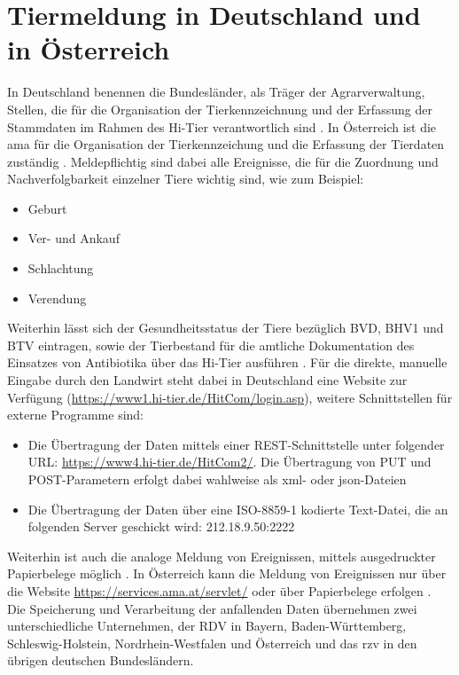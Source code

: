\section{Tiermeldung in Deutschland und in Österreich}
In Deutschland benennen die Bundesländer, als Träger der Agrarverwaltung, Stellen, die für die Organisation der Tierkennzeichnung und der Erfassung der Stammdaten im Rahmen des Hi-Tier verantwortlich sind \autocite{hi-tier_regionalstellen_2015}. 
In Österreich ist die ama für die Organisation der Tierkennzeichung und die Erfassung der Tierdaten zuständig \autocite{agrarmarkt_austria_ama_2016}.
Meldepflichtig sind dabei alle Ereignisse, die für die Zuordnung und Nachverfolgbarkeit einzelner Tiere wichtig sind, wie zum Beispiel:
\begin{itemize}
	\item Geburt \autocite{hi-tier_hi-tier_2015}
	\item Ver- und Ankauf \autocite{hi-tier_hi-tier_2015}
	\item Schlachtung \autocite{hi-tier_hi-tier_2015}
	\item Verendung \autocite{hi-tier_hi-tier_2015}
\end{itemize}
Weiterhin lässt sich der Gesundheitsstatus der Tiere bezüglich BVD, BHV1 und BTV eintragen, sowie der Tierbestand für die amtliche Dokumentation des Einsatzes von Antibiotika über das Hi-Tier ausführen \autocite{hi-tier_hi-tier_2017}. 
Für die direkte, manuelle Eingabe durch den Landwirt steht dabei in Deutschland eine Website zur Verfügung (\url{https://www1.hi-tier.de/HitCom/login.asp}), weitere Schnittstellen für externe Programme sind:
\begin{itemize}
	\item Die Übertragung der Daten mittels einer REST-Schnittstelle unter folgender URL: \url{https://www4.hi-tier.de/HitCom2/}. Die Übertragung von PUT und POST-Parametern erfolgt dabei wahlweise als xml- oder json-Dateien
	\item Die Übertragung der Daten über eine ISO-8859-1 kodierte Text-Datei, die an folgenden Server geschickt wird: 212.18.9.50:2222 \autocite{hi-tier_hitp-spezifikation_2016}
\end{itemize}
Weiterhin ist auch die analoge Meldung von Ereignissen, mittels ausgedruckter Papierbelege möglich \autocite{hi-tier_rinder-datenbank_2015}.
In Österreich kann die Meldung von Ereignissen nur über die Website \url{https://services.ama.at/servlet/} oder über Papierbelege erfolgen \autocite{landwirtschaftskammer_salzburg_tierkennzeichnungen_????}.\\
Die Speicherung und Verarbeitung der anfallenden Daten übernehmen zwei unterschiedliche Unternehmen, der RDV in Bayern, Baden-Württemberg, Schleswig-Holstein, Nordrhein-Westfalen und Österreich \autocite{rdv_rdv_????} und das rzv in den übrigen deutschen Bundesländern. 

